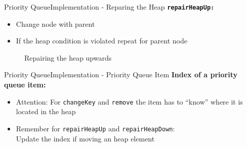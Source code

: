 \begin{frame}{Priority Queue}{Implementation - Reparing the Heap}
  {\color{Mittel-Blau}\texttt{\textbf{repairHeapUp:}}}
  \begin{itemize}
    \item
      Change node with parent
    \item
      If the {\color{Mittel-Blau}heap condition} is violated repeat for parent
      node
  \end{itemize}
  \begin{center}
    \begin{figure}[!h]%
      \begin{columns}%
        \begin{column}{0.45\linewidth}%
          \begin{adjustbox}{width=\linewidth}%
          \end{adjustbox}%
        \end{column}%
        \begin{column}{0.45\linewidth}%
          \begin{adjustbox}{width=\linewidth}%
          \end{adjustbox}%
        \end{column}%
      \end{columns}%
      \caption{Repairing the heap upwards}%
      \label{fig:priority_queue:impl_repair_heap_up2}%
    \end{figure}
  \end{center}
\end{frame}


\begin{frame}{Priority Queue}{Implementation - Priority Queue Item}
  \textbf{Index of a priority queue item:}
  \begin{itemize}
    \item<2->
      {\color{red}Attention:}
      For {\color{Mittel-Blau}\texttt{changeKey}} and
      {\color{Mittel-Blau}\texttt{remove}} the item has to \enquote{know} where
      it is located in the heap
    \item<3->
      Remember for {\color{Mittel-Blau}\texttt{repairHeapUp}} and
      {\color{Mittel-Blau}\texttt{repairHeapDown}}:\\
      Update the index if moving an heap element
  \end{itemize}
\end{frame}


